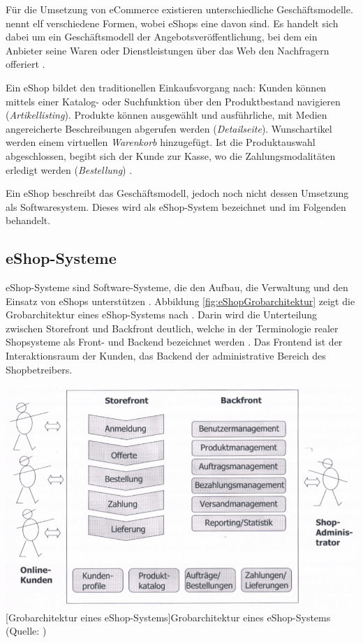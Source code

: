 \documentclass[11pt, a4paper, titlepage, listof=totoc, bibliography=totoc, index=totoc, twoside, openright, headings=normal, draft]{scrreprt}
\begin{document}
Für die Umsetzung von eCommerce existieren unterschiedliche Geschäftsmodelle. \citet{timmers98} nennt elf verschiedene Formen, wobei eShops eine davon sind. Es handelt sich dabei um ein \glqq Geschäftsmodell der Angebotsveröffentlichung, bei dem ein Anbieter seine Waren oder Dienstleistungen über das Web den Nachfragern offeriert\grqq{} \citep{bartelt00}.

Ein eShop bildet den traditionellen Einkaufsvorgang nach: Kunden können mittels einer Katalog- oder Suchfunktion über den Produktbestand navigieren (\emph{Artikellisting}). Produkte können ausgewählt und ausführliche, mit Medien angereicherte Beschreibungen abgerufen werden (\emph{Detailseite}). Wunschartikel werden einem virtuellen \emph{Warenkorb} hinzugefügt. Ist die Produktauswahl abgeschlossen, begibt sich der Kunde zur \glqq Kasse\grqq{}, wo die Zahlungsmodalitäten erledigt werden (\emph{Bestellung}) \citep{boles00}.

Ein eShop beschreibt das Geschäftsmodell, jedoch noch nicht dessen Umsetzung als Softwaresystem. Dieses wird als eShop-System bezeichnet \citep{boles00} und im Folgenden behandelt.

\subsection{eShop-Systeme}
\label{eShop-Systeme}
\glqq eShop-Systeme sind Software-Systeme, die den Aufbau, die Verwaltung und den Einsatz von eShops unterstützen\grqq{} \citep{boles00}. Abbildung \ref{fig:eShopGrobarchitektur} zeigt die Grobarchitektur eines eShop-Systems nach \citet{meier12}. Darin wird die Unterteilung zwischen Storefront und Backfront deutlich, welche in der Terminologie realer Shopsysteme als Front- und Backend bezeichnet werden \citep[vgl.][]{shopwareDoku}. Das Frontend ist der Interaktionsraum der Kunden, das Backend der administrative Bereich des Shopbetreibers.

\vspace{1em}
\begin{minipage}{\linewidth}
	\centering
	\includegraphics[width=0.7\linewidth]{Abbildungen/eShopGrobarchitektur.png}
	[Grobarchitektur eines eShop-Systems]{Grobarchitektur eines eShop-Systems (Quelle: \citet{meier12})}
	\label{fig:eShopGrobarchitektur}
\end{minipage}
\vspace{0.2em}
\end{document}
